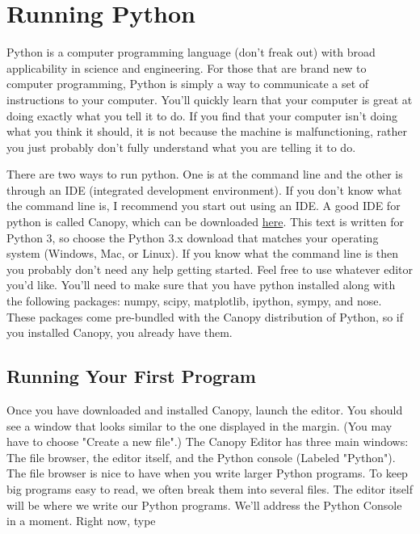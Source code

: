 \chapter{Running Python}
\label{chap:RunningPython}


Python is a computer programming language (don't freak out) with broad
applicability in science and engineering.  For those that are brand
new to computer programming, Python is simply a way to communicate a
set of instructions to your computer.  You'll quickly learn that your
computer is great at doing exactly what you tell it to do.  If you
find that your computer isn't doing what you think it should, it is
not because the machine is malfunctioning, rather you just probably
don't fully understand what you are telling it to do.

There are two ways to run python. One is at the command line and the
other is through an IDE (integrated development environment). If you
don't know what the command line is, I recommend you start out using
an IDE. A good IDE for python is called Canopy, which can
be downloaded \href{https://store.enthought.com/downloads/}{here}. This text is written for Python 3, so choose the Python 3.x download that matches your operating system (Windows, Mac, or Linux).
If you know what the command line is then you probably don't need any help getting started. Feel free to use whatever editor you'd like. You'll need to make sure that you have python installed along with the following packages: numpy, scipy, matplotlib, ipython, sympy, and nose. These packages come pre-bundled with the Canopy distribution of Python, so if you installed Canopy, you already have them.

\section{Running Your First Program}

Once you have downloaded and installed Canopy, launch the editor. You should see a window that looks similar to the one displayed in the margin. (You may have to choose "Create a new file".) The Canopy Editor has three main windows: The file browser, the editor itself, and the Python console (Labeled "Python").
The file browser is nice to have when you write larger Python programs. To keep big programs easy to read, we often break them into several files.
The editor itself will be where we write our Python programs. We'll address the Python Console in a moment. Right now, type


